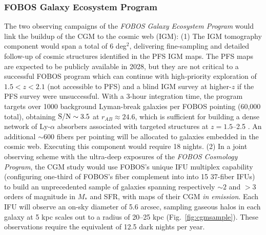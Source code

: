 \documentclass[11pt,a4paper,twoside,onecolumn,openany,final,oldfontcommands]{memoir}
\begin{document}


\subsubsection{FOBOS Galaxy Ecosystem Program}

The two observing campaigns of the {\it FOBOS Galaxy Ecosystem Program} would link the buildup of the CGM to the cosmic web (IGM): (1) The IGM tomography component would span a total of 6 deg$^2$, delivering fine-sampling and detailed follow-up of cosmic structures identified in the PFS IGM maps.  The PFS maps are expected to be publicly available in 2028, but they are not critical to a successful FOBOS program which can continue with high-priority exploration of $1.5 < z < 2.1$ (not accessible to PFS) and a blind IGM survey at higher-$z$ if the PFS survey were unsuccessful.  With a 3-hour integration time, the program targets over 1000 background Lyman-break galaxies per FOBOS pointing (60,000 total), obtaining ${\rm S/N} \sim 3.5$ at $r_{AB} \approx 24.6$, which is sufficient for building a dense network of Ly-$\alpha$ absorbers associated with targeted structures at $z = 1.5$--2.5 \citep[see][]{lee16}. An additional $\sim$600 fibers per pointing will be allocated to galaxies embedded in the cosmic web. Executing this component would require 18 nights.  (2) In a joint observing scheme with the ultra-deep exposures of the {\it FOBOS Cosmology Program}, the CGM study would use FOBOS's unique IFU multiplex capability (configuring one-third of FOBOS's fiber complement into into 15 37-fiber IFUs) to build an unprecedented sample of galaxies spanning respectively $\sim2$ and $>3$ orders of magnitude in $M_\ast$ and SFR, with maps of their CGM {\it in emission}.  Each IFU will observe an on-sky diameter of 5.6 arcsec, sampling gaseous halos in each galaxy at 5 kpc scales out to a radius of 20--25 kpc (Fig.~\ref{fig:cgmsample}).  These observations require the equivalent of 12.5 dark nights per year.

\end{document}
